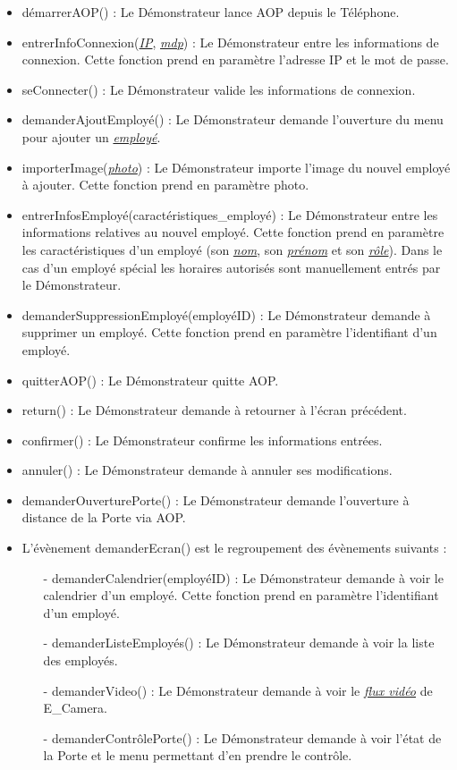     \begin{itemize}
        \item démarrerAOP() : Le Démonstrateur lance AOP depuis le Téléphone.
        \item entrerInfoConnexion(\hyperlink{IP}{\textit{IP}}, \hyperlink{mdp}{\textit{mdp}}) : Le Démonstrateur entre les informations de connexion.
        Cette fonction prend en paramètre l'adresse IP et le mot de passe.
        \item seConnecter() : Le Démonstrateur valide les informations de connexion.
        \item demanderAjoutEmployé() : Le Démonstrateur demande l'ouverture du menu pour ajouter un \hyperlink{emp}{\textit{employé}}.
        \item importerImage(\hyperlink{photo}{\textit{photo}}) : Le Démonstrateur importe l'image du nouvel employé à ajouter.
        Cette fonction prend en paramètre photo.        
        \item entrerInfosEmployé(caractéristiques\_employé) : Le Démonstrateur entre les informations relatives au nouvel employé.
        Cette fonction prend en paramètre les caractéristiques d'un employé (son \hyperlink{nom}{\textit{nom}}, son \hyperlink{prenom}{\textit{prénom}} et son \hyperlink{rol}{\textit{rôle}}).
        Dans le cas d'un employé spécial les horaires autorisés sont manuellement entrés par le Démonstrateur.
        \item demanderSuppressionEmployé(employéID) : Le Démonstrateur demande à supprimer un employé. 
        Cette fonction prend en paramètre l'identifiant d'un employé.
        \item quitterAOP() : Le Démonstrateur quitte AOP.
        \item return() : Le Démonstrateur demande à retourner à l'écran précédent.
        \item confirmer() : Le Démonstrateur confirme les informations entrées.
        \item annuler() : Le Démonstrateur demande à annuler ses modifications.
        \item demanderOuverturePorte() : Le Démonstrateur demande l'ouverture à distance de la Porte via AOP.
        
        \item L'évènement demanderEcran() est le regroupement des évènements suivants :
        \begin{itemize}
            \item[-] demanderCalendrier(employéID) : Le Démonstrateur demande à voir le calendrier d'un employé. 
            Cette fonction prend en paramètre l'identifiant d'un employé. 
            \item[-] demanderListeEmployés() : Le Démonstrateur demande à voir la liste des employés.
            \item[-] demanderVideo() : Le Démonstrateur demande à voir le \hyperlink{video}{\textit{flux vidéo}} de E\_Camera.
            \item[-] demanderContrôlePorte() : Le Démonstrateur demande à voir l'état de la Porte et le menu permettant d'en prendre le contrôle.
        \end{itemize}
    \end{itemize}

